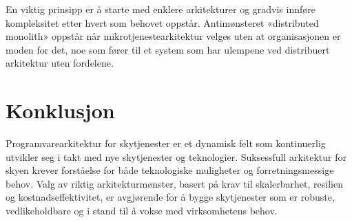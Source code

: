 \documentclass[
    language=norsk,
    doctype=article,
]{../../omnilatex}
\begin{document}
En viktig prinsipp er å starte med enklere arkitekturer og gradvis innføre kompleksitet etter hvert som behovet oppstår. Antimønsteret «distributed monolith» oppstår når mikrotjenestearkitektur velges uten at organisasjonen er moden for det, noe som fører til et system som har ulempene ved distribuert arkitektur uten fordelene.

\section{Konklusjon}
Programvarearkitektur for skytjenester er et dynamisk felt som kontinuerlig utvikler seg i takt med nye skytjenester og teknologier. Suksessfull arkitektur for skyen krever forståelse for både teknologiske muligheter og forretningsmessige behov. Valg av riktig arkitekturmønster, basert på krav til skalerbarhet, resilien og kostnadseffektivitet, er avgjørende for å bygge skytjenester som er robuste, vedlikeholdbare og i stand til å vokse med virksomhetens behov.
\end{document}

